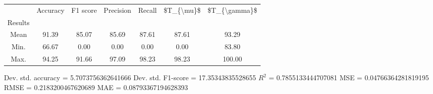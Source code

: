\begin{tabular}{|c|c|c|c|c|c|c|}
\toprule
{} &  Accuracy &  F1 score &  Precision &  Recall &  \$T\_\{\textbackslash mu\}\$ &  \$T\_\{\textbackslash gamma\}\$ \\
Results &           &           &            &         &            &               \\
\hline
Mean    &     91.39 &     85.07 &      85.69 &   87.61 &      87.61 &         93.29 \\
Min.    &     66.67 &      0.00 &       0.00 &    0.00 &       0.00 &         83.80 \\
Max.    &     94.25 &     91.66 &      97.09 &   98.23 &      98.23 &        100.00 \\
\bottomrule
\end{tabular}

 Dev. std. accuracy = 5.7073756362641666
 Dev. std. F1-score = 17.35343835528655
 $R^2$ = 0.7855133444707081
 MSE = 0.04766364281819195
 RMSE = 0.2183200467620689
 MAE = 0.08793367194628393